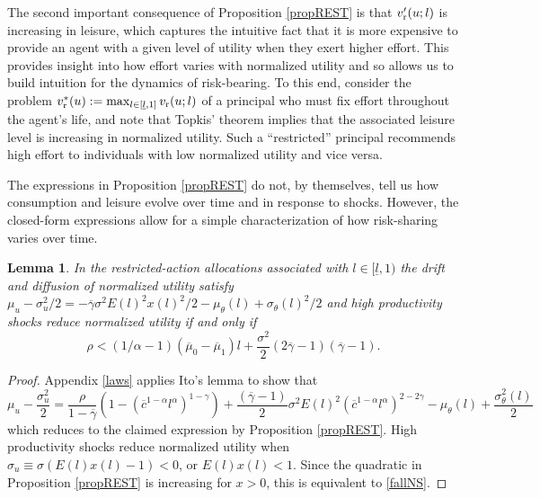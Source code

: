 \documentclass[11pt]{article}
\theoremstyle{plain}
\newtheorem{lemma}[thm]{Lemma}
\begin{document}
The second important consequence of Proposition \ref{propREST} is that $v_{\textnormal{r}}'(u;l)$ is increasing in leisure, which captures the intuitive fact that it is more expensive to provide an agent with a given level of utility when they exert higher effort. This provides insight into how effort varies with normalized utility and so allows us to build intuition for the dynamics of risk-bearing. To this end, consider the problem $v^*_{\textnormal{r}}(u) := \max_{l \in [\underline{l},1]} v_{\textnormal{r}}(u;l)$ of a principal who must fix effort throughout the agent's life, and note that Topkis' theorem implies that the associated leisure level is increasing in normalized utility. Such a ``restricted'' principal recommends high effort to individuals with low normalized utility and vice versa. 

The expressions in Proposition \ref{propREST} do not, by themselves, tell us how consumption and leisure evolve over time and in response to shocks. However, the closed-form expressions allow for a simple characterization of how risk-sharing varies over time. 

\begin{lemma}\label{lawu}
In the restricted-action allocations associated with $l \in [\underline{l},1)$ the drift and diffusion of normalized utility satisfy $\mu_u - \sigma_u^2/2 = -\overline{\gamma}\sigma^2E(l)^2x(l)^2/2 - \mu_{\theta}(l) + \sigma_{\theta}(l)^2/2$ and high productivity shocks reduce normalized utility if and only if 
\begin{equation}
\rho < (1/\alpha-1)(\overline{\mu}_0 - \overline{\mu}_1)l + \frac{\sigma^2}{2}{\left(2\overline{\gamma}-1\right)} (\overline{\gamma}-1).
\label{fallNS} 
\end{equation}
\end{lemma}
\begin{proof}
Appendix \ref{laws} applies Ito's lemma to show that
\begin{equation}
\mu_u - \frac{\sigma_u^2}{2} = \frac{\rho}{1-\overline{\gamma}}(1 - (\overline{c}^{1-\alpha}l^{\alpha})^{1-\gamma}) + \frac{(\overline{\gamma}-1)}{2} \sigma^2 E(l)^2 (\overline{c}^{1-\alpha}l^{\alpha})^{2-2\gamma} - \mu_{\theta}(l) + \frac{\sigma_{\theta}^2(l)}{2}
\label{riskADJ}
\end{equation}
which reduces to the claimed expression by Proposition \ref{propREST}. High productivity shocks reduce normalized utility when $\sigma_u \equiv \sigma (E(l)x(l) - 1) < 0$, or $E(l)x(l) < 1$. Since the quadratic in Proposition \ref{propREST} is increasing for $x>0$, this is equivalent to \eqref{fallNS}.
\end{proof}
\end{document}
